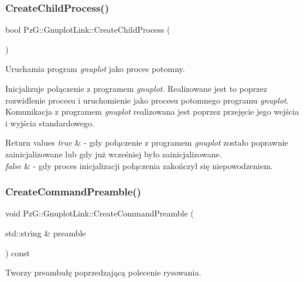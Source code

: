 \subsubsection{\texorpdfstring{Create\+Child\+Process()}{CreateChildProcess()}}
{\footnotesize\ttfamily bool Pz\+G\+::\+Gnuplot\+Link\+::\+Create\+Child\+Process (\begin{DoxyParamCaption}{ }\end{DoxyParamCaption})\hspace{0.3cm}{\ttfamily [protected]}}



Uruchamia program {\itshape gnuplot} jako proces potomny. 

Inicjalizuje połączenie z programem {\itshape gnuplot}. Realizowane jest to poprzez rozwidlenie procesu i uruchomienie jako procesu potomnego programu {\itshape gnuplot}. Komunikacja z programem {\itshape gnuplot} realizowana jest poprzez przejęcie jego wejścia i wyjścia standardowego.


\begin{DoxyRetVals}{Return values}
{\em true} & -\/ gdy połączenie z programem {\itshape gnuplot} zostało poprawnie zainicjalizowane lub gdy już wcześniej było zainicjalizowane. \\
\hline
{\em false} & -\/ gdy proces inicjalizacji połączenia zakończył się niepowodzeniem. \\
\hline
\end{DoxyRetVals}
\mbox{\label{class_pz_g_1_1_gnuplot_link_aa2555a85839c555480c18da5015c0b26}} 
\subsubsection{\texorpdfstring{Create\+Command\+Preamble()}{CreateCommandPreamble()}}
{\footnotesize\ttfamily void Pz\+G\+::\+Gnuplot\+Link\+::\+Create\+Command\+Preamble (\begin{DoxyParamCaption}\item[{std\+::string \&}]{preamble }\end{DoxyParamCaption}) const\hspace{0.3cm}{\ttfamily [protected]}}



Tworzy preambułę poprzedzającą polecenie rysowania. 

